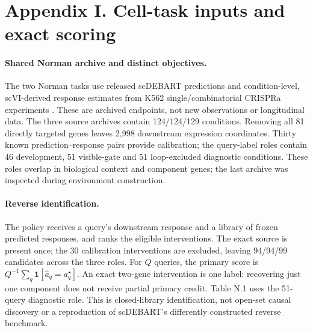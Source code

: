 \section*{Appendix I. Cell-task inputs and exact scoring}

\paragraph{Shared Norman archive and distinct objectives.}
The two Norman tasks use released scDEBART predictions and condition-level,
scVI-derived response estimates \citep{sung2026scdebart} from K562
single/combinatorial CRISPRa experiments \citep{norman2019genetic}.
These are archived endpoints, not new observations or longitudinal data. The three source
archives contain 124/124/129 conditions. Removing all 81 directly targeted
genes leaves 2,998 downstream expression coordinates. Thirty known
prediction--response pairs provide calibration; the query-label roles
contain 46 development, 51 visible-gate and 51 loop-excluded diagnostic
conditions. These roles overlap in biological context and component genes;
the last archive was inspected during environment construction.

\paragraph{Reverse identification.}
The policy receives a query's downstream response and a library of frozen
predicted responses, and ranks the eligible interventions. The exact source
is present once; the 30 calibration interventions are excluded, leaving
94/94/99 candidates across the three roles. For $Q$ queries, the primary
score is $Q^{-1}\sum_q\mathbf{1}[\widehat a_q=a_q^\star]$.
An exact two-gene intervention is one label: recovering just one component
does not receive partial primary credit. Table N.1 uses the 51-query diagnostic
role. This is closed-library identification, not open-set causal discovery
or a reproduction of scDEBART's differently constructed reverse benchmark.

